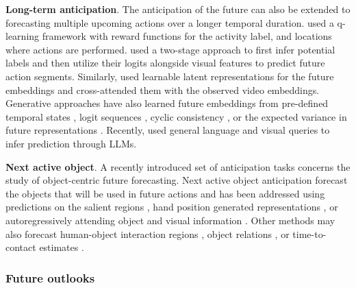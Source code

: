 \noindent
\textbf{Long-term anticipation}. The anticipation of the future can also be extended to forecasting multiple upcoming actions over a longer temporal duration.  used a q-learning framework with reward functions for the activity label, and locations where actions are performed.  used a two-stage approach to first infer potential labels and then utilize their logits alongside visual features to predict future action segments. Similarly,  used learnable latent representations for the future embeddings and cross-attended  them with the observed video embeddings. Generative approaches have also learned future embeddings from pre-defined temporal states , logit sequences , cyclic consistency , or the expected variance in future representations . Recently,  used general language and visual queries to infer prediction through LLMs.

\noindent
\textbf{Next active object}. A recently introduced set of anticipation tasks concerns the study of object-centric future forecasting. Next active object anticipation forecast the objects that will be used in future actions and has been addressed using predictions on the salient regions , hand position generated representations , or autoregressively attending object and visual information . Other methods may also forecast human-object interaction regions , object relations , or time-to-contact estimates .

\subsubsection{Future outlooks}
\label{sec:forecasting::anticipation:::outlooks}


